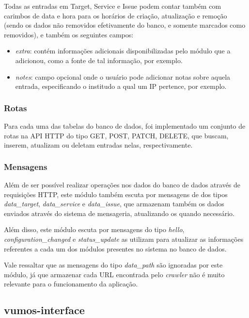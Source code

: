     Todas as entradas em Target, Service e Issue podem contar também com carimbos de data e hora para os horários de criação, atualização e remoção (sendo os dados não removidos efetivamente do banco, e somente marcados como removidos), e também os seguintes campos: 
    \begin{itemize}
        \item \emph{extra}: contém informações adicionais disponibilizadas pelo módulo que a adicionou, como a fonte de tal informação, por exemplo.
        \item \emph{notes}: campo opcional onde o usuário pode adicionar notas sobre aquela entrada, especificando o institudo a qual um IP pertence, por exemplo.
    \end{itemize}
    
    \subsubsection{Rotas}
    
    Para cada uma das tabelas do banco de dados, foi implementado um conjunto de rotas na API HTTP do tipo GET, POST, PATCH, DELETE, que buscam, inserem, atualizam ou deletam entradas nelas, respectivamente.
    
    \subsubsection{Mensagens}
    
    Além de ser possível realizar operações nos dados do banco de dados através de requisições HTTP, este módulo também escuta por mensagens de dos tipos \textit{data\_target}, \textit{data\_service} e \textit{data\_issue}, que armazenam também os dados enviados através do sistema de mensageria, atualizando os quando necessário.
    
    Além disso, este módulo escuta por mensagens do tipo \textit{hello}, \textit{configuration\_changed} e \textit{status\_update} as utilizam para atualizar as informações referentes a cada um dos módulos presentes no sistema no banco de dados.
    
    Vale ressaltar que as mensagens do tipo \textit{data\_path} são ignoradas por este módulo, já que armazenar cada URL encontrada pelo \textit{crawler} não é muito relevante para o funcionamento da aplicação.
    

    \subsection{vumos-interface}
    
